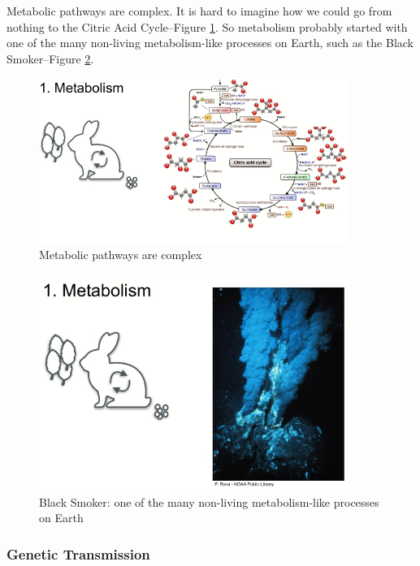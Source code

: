 \documentclass[]{article}
\begin{document}
Metabolic pathways are complex. It is hard to imagine how we could go from nothing to the Citric Acid Cycle--Figure \ref{fig:CitricAcidCycle}. So metabolism probably started with one of the many non-living metabolism-like processes on Earth, such as the Black Smoker--Figure \ref{fig:BlackSmoker}.
\begin{figure}[H]
	\caption{Metabolic pathways are complex}\label{fig:CitricAcidCycle}
	\includegraphics[width=0.9\textwidth]{CitricAcidCycle}
\end{figure}

\begin{figure}[H]
	\caption[Black Smoker]{Black Smoker: one of the many non-living metabolism-like processes on Earth}\label{fig:BlackSmoker}
	\includegraphics[width=0.9\textwidth]{BlackSmoker}
\end{figure}

\subsubsection{Genetic Transmission}
\end{document}
